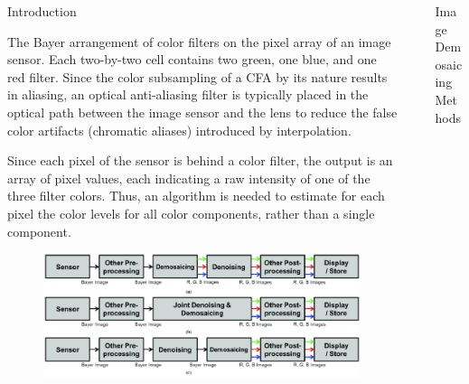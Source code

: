 \documentclass[final]{beamer}
\newlength{\sepwidth}
\newlength{\colwidth}
\newcommand{\separatorcolumn}{\begin{column}{\sepwidth}\end{column}}
\begin{document}
\begin{frame}[t]
\begin{columns}[t]
\begin{column}{\colwidth}
\begin{block}{Introduction}
\par The Bayer arrangement of color filters on the pixel array of an image sensor. Each two-by-two cell contains two green, one blue, and one red filter.
Since the color subsampling of a CFA by its nature results in aliasing, an optical anti-aliasing filter is typically placed in the optical path between the image sensor and the lens to reduce the false color artifacts (chromatic aliases) introduced by interpolation.

Since each pixel of the sensor is behind a color filter, the output is an array of pixel values, each indicating a raw intensity of one of the three filter colors. Thus, an algorithm is needed to estimate for each pixel the color levels for all color components, rather than a single component.
\lipsum
\\
  \end{block}
  \begin{figure}
    \includegraphics[width=2.0\textwidth]{logos/dip.png}
    \end{figure}
\end{column}
\separatorcolumn

\begin{column}{\colwidth}

\begin{block}{Image Demosaicing Methods}
  

\end{block}
\end{column}
\end{columns}
\end{frame}
\end{document}
